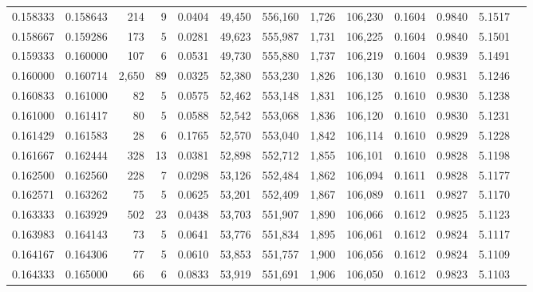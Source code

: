 \begin{tabular}{rrrrrrrrrrrrr}
0.158333 & 0.158643 &   214 &   9 &                                     0.0404 &  49,450 & 556,160 &   1,726 & 106,230 & 0.1604 & 0.9840 & 5.1517 \\
0.158667 & 0.159286 &   173 &   5 &                                     0.0281 &  49,623 & 555,987 &   1,731 & 106,225 & 0.1604 & 0.9840 & 5.1501 \\
0.159333 & 0.160000 &   107 &   6 &                                     0.0531 &  49,730 & 555,880 &   1,737 & 106,219 & 0.1604 & 0.9839 & 5.1491 \\
0.160000 & 0.160714 & 2,650 &  89 &                                     0.0325 &  52,380 & 553,230 &   1,826 & 106,130 & 0.1610 & 0.9831 & 5.1246 \\
0.160833 & 0.161000 &    82 &   5 &                                     0.0575 &  52,462 & 553,148 &   1,831 & 106,125 & 0.1610 & 0.9830 & 5.1238 \\
0.161000 & 0.161417 &    80 &   5 &                                     0.0588 &  52,542 & 553,068 &   1,836 & 106,120 & 0.1610 & 0.9830 & 5.1231 \\
0.161429 & 0.161583 &    28 &   6 &                                     0.1765 &  52,570 & 553,040 &   1,842 & 106,114 & 0.1610 & 0.9829 & 5.1228 \\
0.161667 & 0.162444 &   328 &  13 &                                     0.0381 &  52,898 & 552,712 &   1,855 & 106,101 & 0.1610 & 0.9828 & 5.1198 \\
0.162500 & 0.162560 &   228 &   7 &                                     0.0298 &  53,126 & 552,484 &   1,862 & 106,094 & 0.1611 & 0.9828 & 5.1177 \\
0.162571 & 0.163262 &    75 &   5 &                                     0.0625 &  53,201 & 552,409 &   1,867 & 106,089 & 0.1611 & 0.9827 & 5.1170 \\
0.163333 & 0.163929 &   502 &  23 &                                     0.0438 &  53,703 & 551,907 &   1,890 & 106,066 & 0.1612 & 0.9825 & 5.1123 \\
0.163983 & 0.164143 &    73 &   5 &                                     0.0641 &  53,776 & 551,834 &   1,895 & 106,061 & 0.1612 & 0.9824 & 5.1117 \\
0.164167 & 0.164306 &    77 &   5 &                                     0.0610 &  53,853 & 551,757 &   1,900 & 106,056 & 0.1612 & 0.9824 & 5.1109 \\
0.164333 & 0.165000 &    66 &   6 &                                     0.0833 &  53,919 & 551,691 &   1,906 & 106,050 & 0.1612 & 0.9823 & 5.1103 \\

\end{tabular}
